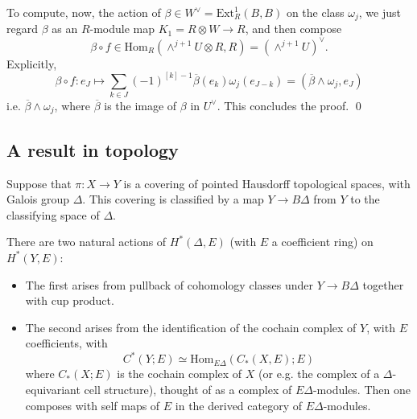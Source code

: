 \documentclass[10pt]{amsart}
\newcommand{\Ext}{\mathrm{Ext}}
\newcommand{\Hom}{\mathrm{Hom}}
\theoremstyle{remark}
\begin{document}
To compute, now, the action of $\beta \in W^{\vee} =\Ext^1_R(B, B) $
on the class $\omega_j$, we just 
regard $\beta$ as an $R$-module map $K_1=  R \otimes W \rightarrow R$, 
and then compose 
 $$ \beta \circ f \in \Hom_R(\wedge^{j+1} U \otimes R, R) = \left( \wedge^{j+1} U \right)^{\vee}.$$
 Explicitly,  
   $$\beta \circ f:  e_J \mapsto \sum_{k \in J} (-1)^{[k]-1} \overline{ \beta}(e_k) \omega_j(e_{J-k})  = (\overline{\beta} \wedge \omega_j, e_J)$$
  i.e. $ \overline{\beta} \wedge \omega_j$, where $\overline{\beta}$ is the image of $\beta$ in $U^{\vee}$.  
  This concludes the proof.
  \qed 
  
  
%
%
%
%
%
%
%
%
%
%
%
%
%
%
%
%
%
  
   \subsection{A result in topology} \label{sec:remedialtopology}  
 Suppose that  $\pi: X \rightarrow Y$ is a covering of pointed Hausdorff topological spaces, with Galois group $\Delta$. 
This covering is classified by a map $Y \rightarrow B \Delta$ from $Y$ to the classifying space of $\Delta$. 

There are  two natural actions of $H^*(\Delta, E)$ (with $E$ a coefficient ring)
on $H^*(Y, E)$:

\begin{itemize}
\item[(a)] The first arises from pullback of cohomology classes under $Y \rightarrow B\Delta$
together with cup product. 
\item[(b)] The second arises from the identification of the cochain complex of $Y$, with $E$ coefficients,  with 
$$C^*(Y; E) \simeq \Hom_{E \Delta}(C_*(X, E); E)$$
where $C_*(X; E)$ is the cochain complex of $X$ (or e.g. the complex of a $\Delta$-equivariant cell structure),  thought of as a complex of $E \Delta$-modules.
Then one composes with self maps of $E$ in the derived category of $E \Delta$-modules. 
 \end{itemize}
 
%
%
%
%
%
%
%
%
%
%
%
%
%
%
  
\end{document}

